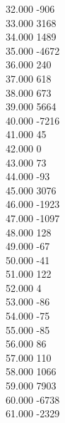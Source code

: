 { 32.000	-906 \\
 33.000	3168 \\
 34.000	1489 \\
 35.000	-4672 \\
 36.000	240 \\
 37.000	618 \\
 38.000	673 \\
 39.000	5664 \\
 40.000	-7216 \\
 41.000	45 \\
 42.000	0 \\
 43.000	73 \\
 44.000	-93 \\
 45.000	3076 \\
 46.000	-1923 \\
 47.000	-1097 \\
 48.000	128 \\
 49.000	-67 \\
 50.000	-41 \\
 51.000	122 \\
 52.000	4 \\
 53.000	-86 \\
 54.000	-75 \\
 55.000	-85 \\
 56.000	86 \\
 57.000	110 \\
 58.000	1066 \\
 59.000	7903 \\
 60.000	-6738 \\
 61.000	-2329 \\
}
